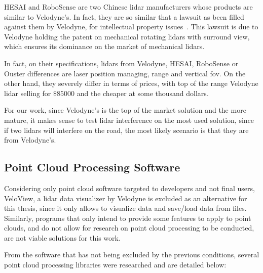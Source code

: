 HESAI and RoboSense are two Chinese \ac{lidar} manufacturers whose products are similar to Velodyne's. In fact, they are so similar that a lawsuit as been filled against them by Velodyne, for intellectual property issues~\cite{VelodyneLawsuit}. This lawsuit is due to Velodyne holding the patent on mechanical rotating \acp{lidar} with surround view\cite{Hall2011}, which ensures its dominance on the market of mechanical \acp{lidar}. 

In fact, on their specifications, \acp{lidar} from Velodyne, HESAI, RoboSense or Ouster differences are laser position managing, range and vertical \ac{fov}. On the other hand, they severely differ in terms of prices, with top of the range Velodyne \ac{lidar} selling for $\$85000$ and the cheaper at some thousand dollars. 

For our work, since Velodyne's is the top of the market solution and the more mature, it makes sense to test \ac{lidar} interference on the most used solution, since if two \acp{lidar} will interfere on the road, the most likely scenario is that they are from Velodyne's.

\subsection{Point Cloud Processing Software}
Considering only point cloud software targeted to developers and not final users, VeloView\texttrademark, a \ac{lidar} data visualizer by Velodyne is excluded as an alternative for this thesis, since it only allows to visualize data and save/load data from files. Similarly, programs that only intend to provide some features to apply to point clouds, and do not allow for research on point cloud processing to be conducted, are not viable solutions for this work. 

From the software that has not being excluded by the previous conditions, several point cloud processing libraries were researched and are detailed below:

